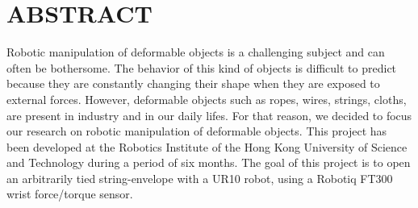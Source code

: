 \chapter{ABSTRACT}
\label{ch:abstract}

Robotic manipulation of deformable objects is a challenging subject and can often be bothersome. The behavior of this kind of objects is difficult to predict because they are constantly changing their shape when they are exposed to external forces. However, deformable objects such as ropes, wires, strings, cloths, are present in industry and in our daily lifes. For that reason, we decided to focus our research on robotic manipulation of deformable objects. This project has been developed at the Robotics Institute of the Hong Kong University of Science and Technology during a period of six months. The goal of this project is to open an arbitrarily tied string-envelope with a UR10 robot, using a Robotiq FT300 wrist force/torque sensor. 

